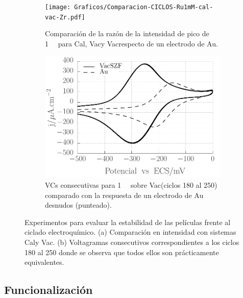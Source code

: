 		 			\begin{figure}[th]
			   	    \begin{subfigure}[t]{0.495\textwidth}
			        	\texttt{[image: Graficos/Comparacion-CICLOS-Ru1mM-cal-vac-Zr.pdf]}
			        	\caption{Comparación de la razón de la intensidad de pico de \ru\space \SI{1}{\milli\Molar} para Cal\pdmF, Vac\pdmF\space y Vac\pdmZ\space respecto de un electrodo de Au.}
			        	\label{fig:zr-comp-a}
			         	\end{subfigure}
			     		\begin{subfigure}[t]{0.495\textwidth}
			        	\includegraphics[width=1\textwidth]{Graficos/Zr-Ru1mM-181-246Ciclos.pdf}
			        	\vspace*{-0.40cm}\caption{VCs consecutivas para  \ru\space \SI{1}{\milli\Molar} sobre Vac\pdmZ\space (ciclos 180 al 250) comparado con la respuesta de un electrodo de Au desnudos (punteado).}
			        	\label{fig:zr-comp-b}
			         	\end{subfigure}
			         	\caption[Estabilidad de las \pdmZ]{Experimentos para evaluar la estabilidad de las películas \pdmZ\space frente al ciclado electroquímico. (a) Comparación en intensidad con sistemas Cal\pdmF\space y Vac\pdmF. (b) Voltagramas consecutivos correspondientes a los ciclos 180 al 250 donde se observa que todos ellos son prácticamente equivalentes.}
			         	\label{fig:zr-comp}
			     	\end{figure}		

\subsection{Funcionalización}

